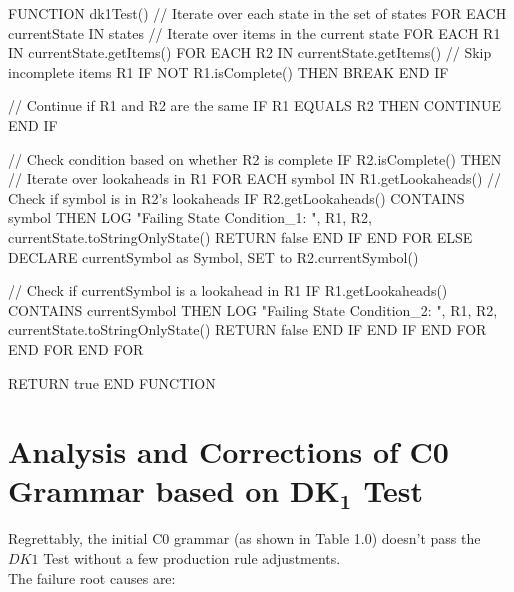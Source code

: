 \begin{codeblock}
    FUNCTION dk1Test()
    // Iterate over each state in the set of states
    FOR EACH currentState IN states
    // Iterate over items in the current state
    FOR EACH R1 IN currentState.getItems()
    FOR EACH R2 IN currentState.getItems()
    // Skip incomplete items R1
    IF NOT R1.isComplete() THEN
    BREAK
    END IF

    // Continue if R1 and R2 are the same
    IF R1 EQUALS R2 THEN
    CONTINUE
    END IF

    // Check condition based on whether R2 is complete
    IF R2.isComplete() THEN
    // Iterate over lookaheads in R1
    FOR EACH symbol IN R1.getLookaheads()
    // Check if symbol is in R2's lookaheads
    IF R2.getLookaheads() CONTAINS symbol THEN
    LOG "Failing State Condition_1: ", R1, R2, currentState.toStringOnlyState()
    RETURN false
    END IF
    END FOR
    ELSE
    DECLARE currentSymbol as Symbol, SET to R2.currentSymbol()

    // Check if currentSymbol is a lookahead in R1
    IF R1.getLookaheads() CONTAINS currentSymbol THEN
    LOG "Failing State Condition_2: ", R1, R2, currentState.toStringOnlyState()
    RETURN false
    END IF
    END IF
    END FOR
    END FOR
    END FOR

    RETURN true
    END FUNCTION
\end{codeblock}

\newpage


\section{Analysis and Corrections of C0 Grammar based on \(\boldsymbol{DK_{1}}\) Test}\label{sec:Analysis and Corrections of C0 Grammar based on DK1 Test}

Regrettably, the initial C0 grammar (as shown in Table 1.0) doesn’t pass the \(DK1\) Test without a few production rule adjustments.\\

The failure root causes are:


